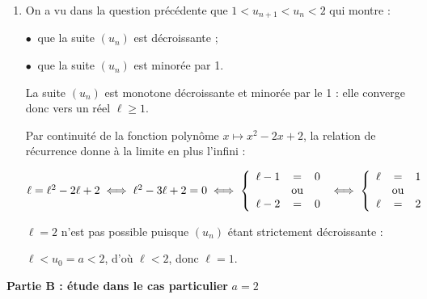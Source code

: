 \begin{enumerate}
\begin{enumerate}
		\emph{Hérédité} : soit $n \in \N$ tel que $u_n < 2$.

$u_n < 2 \iff u_n - 2 < 0$ et on a admis que $u_n > 1 \iff u_n - 1 > 0$, donc d'après le \textbf{1 b.} 	$\left(u_n - 1\right)\left(u_n - 2\right) < 0$ c'est-à-dire $u_{n+1} - u_n  < 0\iff u_{n+1} < u_n < 2$, d'où par transitivité : $u_{n+1} < 2$ : l'inégalité est vraie au rang $n + 1$.

\emph{Conclusion} : l'inégalité est vraie au rang 0 et si elle est vraie au rang $n$, elle l'est aussi au rang $n + 1$, donc par le principe de récurrence :

pour tout naturel $n \in \N, \:\: 1< u_n < 2$.
		\item 
On a vu dans la question précédente que $1 < u_{n+1} < u_n < 2$ qui montre :
		
		$\bullet~$ que la suite $\left(u_n\right)$ est décroissante ;
		
		$\bullet~$ que la suite $\left(u_n\right)$ est minorée par 1.
		
		La suite  $\left(u_n\right)$ est monotone décroissante et minorée par le 1 : elle converge donc vers un réel $\ell \geqslant 1$.
		
		Par continuité de la fonction polynôme $x \longmapsto x^2 - 2x + 2$, la relation de récurrence donne à la limite en plus l'infini :
		
		$\ell = \ell^2 - 2\ell + 2 \iff \ell^2 - 3\ell + 2  = 0 \iff \left\{\begin{array}{l c l}
\ell - 1&=&0\\
&\text{ou}&\\
\ell - 2&=&0\\
\end{array}\right. \iff \left\{\begin{array}{l c l}
\ell &=&1\\
&\text{ou}&\\
\ell &=&2\\
\end{array}\right. $

$\ell = 2$ n'est pas possible puisque $\left(u_n\right)$ étant strictement décroissante : 

$\ell < u_0 = a < 2$, d'où $\ell < 2$, \:donc $\ell = 1$.
	\end{enumerate}
\end{enumerate}
	
	\bigskip
	
\textbf{Partie B : étude dans le cas particulier }\boldmath $a = 2$\unboldmath

